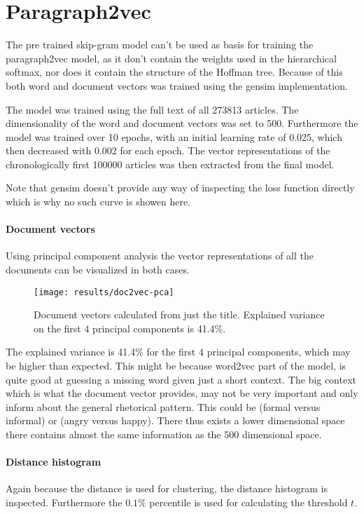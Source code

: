 \section{Paragraph2vec}

The pre trained skip-gram model can't be used as basis for training the paragraph2vec model, as it don't contain the weights used in the hierarchical softmax, nor does it contain the structure of the Hoffman tree. Because of this both word and document vectors was trained using the gensim implementation.

The model was trained using the full text of all 273813 articles. The dimensionality of the word and document vectors was set to 500. Furthermore the model was trained over 10 epochs, with an initial learning rate of 0.025, which then decreased with 0.002 for each epoch. The vector representations of the chronologically first 100000 articles was then extracted from the final model.

Note that gensim doesn't provide any way of inspecting the loss function directly which is why no such curve is showen here.  

\paragraph{Document vectors} Using principal component analysis the vector representations of all the documents can be visualized in both cases.

\begin{figure}[H]
	\centering
	\texttt{[image: results/doc2vec-pca]}
	\caption{Document vectors calculated from just the title. Explained variance on the first 4 principal components is 41.4\%.}
\end{figure}

The explained variance is 41.4\% for the first 4 principal components, which may be higher than expected. This might be because word2vec part of the model, is quite good at guessing a missing word given just a short context. The big context which is what the document vector provides, may not be very important and only inform about the general rhetorical pattern. This could be (formal versus informal) or (angry versus happy). There thus exists a lower dimensional space there contains almost the same information as the 500 dimensional space.

\paragraph{Distance histogram} Again because the distance is used for clustering, the distance histogram is inspected. Furthermore the $0.1\%$ percentile is used for calculating the threshold $t$.

